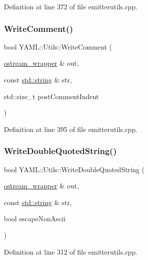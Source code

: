 Definition at line 372 of file emitterutils.\+cpp.

\mbox{\label{namespace_y_a_m_l_1_1_utils_a83f522e522e5ca04f5618a03d1e49795}} 
\subsubsection{\texorpdfstring{WriteComment()}{WriteComment()}}
{\footnotesize\ttfamily bool Y\+A\+M\+L\+::\+Utils\+::\+Write\+Comment (\begin{DoxyParamCaption}\item[{\mbox{\hyperlink{class_y_a_m_l_1_1ostream__wrapper}{ostream\+\_\+wrapper}} \&}]{out,  }\item[{const \mbox{\hyperlink{glad_8h_ac83513893df92266f79a515488701770}{std\+::string}} \&}]{str,  }\item[{std\+::size\+\_\+t}]{post\+Comment\+Indent }\end{DoxyParamCaption})}



Definition at line 395 of file emitterutils.\+cpp.

\mbox{\label{namespace_y_a_m_l_1_1_utils_afeb4d005f93fc2d51d02cd4d658ed356}} 
\subsubsection{\texorpdfstring{WriteDoubleQuotedString()}{WriteDoubleQuotedString()}}
{\footnotesize\ttfamily bool Y\+A\+M\+L\+::\+Utils\+::\+Write\+Double\+Quoted\+String (\begin{DoxyParamCaption}\item[{\mbox{\hyperlink{class_y_a_m_l_1_1ostream__wrapper}{ostream\+\_\+wrapper}} \&}]{out,  }\item[{const \mbox{\hyperlink{glad_8h_ac83513893df92266f79a515488701770}{std\+::string}} \&}]{str,  }\item[{bool}]{escape\+Non\+Ascii }\end{DoxyParamCaption})}



Definition at line 312 of file emitterutils.\+cpp.

